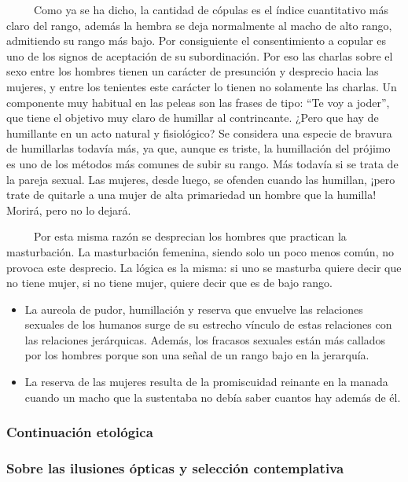 ~ ~ ~ Como ya se ha dicho, la cantidad de cópulas es el índice
cuantitativo más claro del rango, además la hembra se deja normalmente
al macho de alto rango, admitiendo su rango más bajo. Por consiguiente
el consentimiento a copular es uno de los signos de aceptación de su
subordinación. Por eso las charlas sobre el sexo entre los hombres
tienen un carácter de presunción y desprecio hacia las mujeres, y entre
los tenientes este carácter lo tienen no solamente las charlas. Un
componente muy habitual en las peleas son las frases de tipo: ``Te voy a
joder'', que tiene el objetivo muy claro de humillar al contrincante.
¿Pero que hay de humillante en un acto natural y fisiológico? Se
considera una especie de bravura de humillarlas todavía más, ya que,
aunque es triste, la humillación del prójimo es uno de los métodos más
comunes de subir su rango. Más todavía si se trata de la pareja sexual.
Las mujeres, desde luego, se ofenden cuando las humillan, ¡pero trate de
quitarle a una mujer de alta primariedad un hombre que la humilla!
Morirá, pero no lo dejará.

~ ~ ~ Por esta misma razón se desprecian los hombres que practican la
masturbación. La masturbación femenina, siendo solo un poco menos común,
no provoca este desprecio. La lógica es la misma: si uno se masturba
quiere decir que no tiene mujer, si no tiene mujer, quiere decir que es
de bajo rango.

\begin{itemize}
\tightlist
\item
  La aureola de pudor, humillación y reserva que envuelve las relaciones
  sexuales de los humanos surge de su estrecho vínculo de estas
  relaciones con las relaciones jerárquicas. Además, los fracasos
  sexuales están más callados por los hombres porque son una señal de un
  rango bajo en la jerarquía.
\item
  La reserva de las mujeres resulta de la promiscuidad reinante en la
  manada cuando un macho que la sustentaba no debía saber cuantos hay
  además de él.
\end{itemize}

\subsubsection{Continuación
etológica}\label{continuaciuxf3n-etoluxf3gica}

\protect\hypertarget{M19B}{}{}

\subsubsection{Sobre las ilusiones ópticas y selección
contemplativa}\label{sobre-las-ilusiones-uxf3pticas-y-selecciuxf3n-contemplativa}

